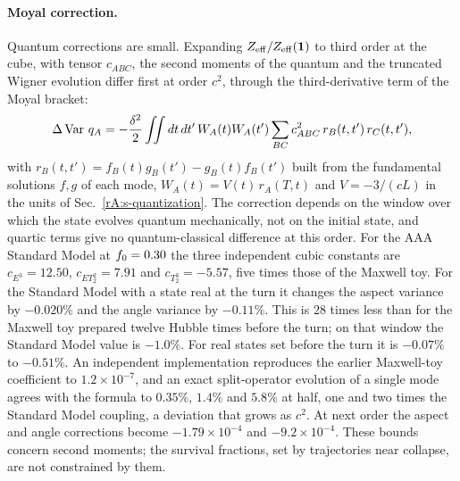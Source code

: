 \paragraph{Moyal correction.}
Quantum corrections are small.
Expanding $Z_{\rm eff}/Z_{\rm eff}(\mathbf{1})$ to third order at the cube, with tensor $c_{ABC}$, the second moments of the quantum and the truncated Wigner evolution differ first at order $c^2$, through the third-derivative term of the Moyal bracket:
\begin{equation}
\Delta\operatorname{Var}\,q_A=-\frac{\delta^2}{2}\iint dt\,dt'\,W_A(t)W_A(t')\sum_{BC}c_{ABC}^2\,r_B(t,t')\,r_C(t,t'),
\end{equation}
with $r_B(t,t')=f_B(t)g_B(t')-g_B(t)f_B(t')$ built from the fundamental solutions $f,g$ of each mode, $W_A(t)=V(t)\,r_A(T,t)$ and $V=-3/(cL)$ in the units of Sec.~\ref{rA:s-quantization}.
The correction depends on the window over which the state evolves quantum mechanically, not on the initial state, and quartic terms give no quantum-classical difference at this order.
For the AAA Standard Model at $f_0=0.30$ the three independent cubic constants are $c_{E^3}=12.50$, $c_{ET_2^2}=7.91$ and $c_{T_2^3}=-5.57$, five times those of the Maxwell toy. %
For the Standard Model with a state real at the turn it changes the aspect variance by $-0.020\%$ and the angle variance by $-0.11\%$. %
This is $28$ times less than for the Maxwell toy prepared twelve Hubble times before the turn; on that window the Standard Model value is $-1.0\%$. %
For real states set before the turn it is $-0.07\%$ to $-0.51\%$. %
An independent implementation reproduces the earlier Maxwell-toy coefficient to $1.2\times10^{-7}$, and an exact split-operator evolution of a single mode agrees with the formula to $0.35\%$, $1.4\%$ and $5.8\%$ at half, one and two times the Standard Model coupling, a deviation that grows as $c^2$. %
At next order the aspect and angle corrections become $-1.79\times10^{-4}$ and $-9.2\times10^{-4}$. %
These bounds concern second moments; the survival fractions, set by trajectories near collapse, are not constrained by them.

